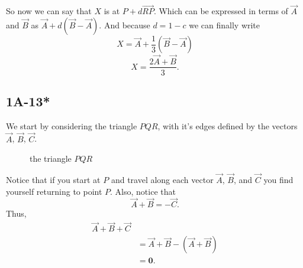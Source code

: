 So now we can say that $X$ is at $P + d\vec{RP}$.
 Which can be expressed in terms of $\vec{A}$ and $\vec{B}$ as
 $\vec{A} + d(\vec{B} - \vec{A})$. And because $d = 1-c$ we can
 finally write \[X = \vec{A} + \frac{1}{3}(\vec{B} - \vec{A})\]
 \[X = \frac{2\vec{A} + \vec{B}}{3}.\]


\subsection*{1A-13*}

We start by considering the triangle $PQR$,
with it's edges defined by the vectors $\vec{A}$, $\vec{B}$, $\vec{C}$.


\begin{figure}[!h]
\centering
{}
\caption{the triangle $PQR$}
\end{figure}

Notice that if you start at $P$ and travel along each vector $\vec{A}$, $\vec{B}$,
and $\vec{C}$ you find yourself returning to point $P$. Also, notice that 
\[\vec{A} + \vec{B} = -\vec{C}.\]
Thus, 
\begin{align*}
\vec{A} + \vec{B} + \vec{C}\\ &= \vec{A} + \vec{B}  - (\vec{A} + \vec{B})\\
&= \mathbf{0}.
\end{align*}

